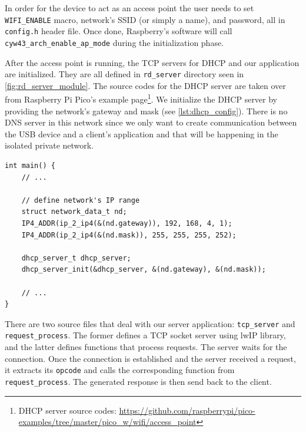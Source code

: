 In order for the device to act as an access point the user needs to set \verb|WIFI_ENABLE| macro, network's SSID (or simply a name), and password, all in \verb|config.h| header file. Once done, Raspberry's software will call \verb|cyw43_arch_enable_ap_mode| during the initialization phase.

After the access point is running, the TCP servers for DHCP and our application are initialized. They are all defined in \verb|rd_server| directory seen in \autoref{fig:rd_server_module}. The source codes for the DHCP server are taken over from Raspberry Pi Pico's example page\footnote{DHCP server source codes: \url{https://github.com/raspberrypi/pico-examples/tree/master/pico_w/wifi/access_point}}. We initialize the DHCP server by providing the network's gateway and mask (see \autoref{lst:dhcp_config}). There is no DNS server in this network since we only want to create communication between the USB device and a client's application and that will be happening in the isolated private network.

\begin{lstlisting}
int main() {
    // ...

    // define network's IP range
    struct network_data_t nd;
    IP4_ADDR(ip_2_ip4(&(nd.gateway)), 192, 168, 4, 1);
    IP4_ADDR(ip_2_ip4(&(nd.mask)), 255, 255, 255, 252);

    dhcp_server_t dhcp_server;
    dhcp_server_init(&dhcp_server, &(nd.gateway), &(nd.mask));

    // ...
}
\end{lstlisting}

There are two source files that deal with our server application: \verb|tcp_server| and \verb|request_process|. The former defines a TCP socket server using lwIP library, and the latter defines functions that process requests. The server waits for the connection. Once the connection is established and the server received a request, it extracts its \verb|opcode| and calls the corresponding function from \verb|request_process|. The generated response is then send back to the client.

